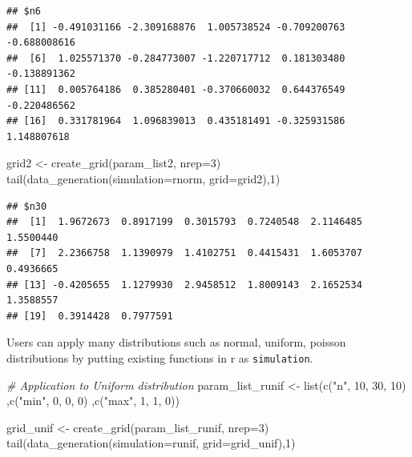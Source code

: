 \documentclass[11pt,a4paper]{article}
\newenvironment{Shaded}{\begin{snugshade}}{\end{snugshade}}
\newcommand{\AttributeTok}[1]{\textcolor[rgb]{0.77,0.63,0.00}{#1}}
\newcommand{\CommentTok}[1]{\textcolor[rgb]{0.56,0.35,0.01}{\textit{#1}}}
\newcommand{\DecValTok}[1]{\textcolor[rgb]{0.00,0.00,0.81}{#1}}
\newcommand{\FunctionTok}[1]{\textcolor[rgb]{0.00,0.00,0.00}{#1}}
\newcommand{\NormalTok}[1]{#1}
\newcommand{\OtherTok}[1]{\textcolor[rgb]{0.56,0.35,0.01}{#1}}
\newcommand{\StringTok}[1]{\textcolor[rgb]{0.31,0.60,0.02}{#1}}
\begin{document}
\begin{verbatim}
## $n6
##  [1] -0.491031166 -2.309168876  1.005738524 -0.709200763 -0.688008616
##  [6]  1.025571370 -0.284773007 -1.220717712  0.181303480 -0.138891362
## [11]  0.005764186  0.385280401 -0.370660032  0.644376549 -0.220486562
## [16]  0.331781964  1.096839013  0.435181491 -0.325931586  1.148807618
\end{verbatim}

\begin{Shaded}
\begin{Highlighting}[]
\NormalTok{grid2 }\OtherTok{\textless{}{-}} \FunctionTok{create\_grid}\NormalTok{(param\_list2, }\AttributeTok{nrep=}\DecValTok{3}\NormalTok{)}
\FunctionTok{tail}\NormalTok{(}\FunctionTok{data\_generation}\NormalTok{(}\AttributeTok{simulation=}\NormalTok{rnorm, }\AttributeTok{grid=}\NormalTok{grid2),}\DecValTok{1}\NormalTok{)}
\end{Highlighting}
\end{Shaded}

\begin{verbatim}
## $n30
##  [1]  1.9672673  0.8917199  0.3015793  0.7240548  2.1146485  1.5500440
##  [7]  2.2366758  1.1390979  1.4102751  0.4415431  1.6053707  0.4936665
## [13] -0.4205655  1.1279930  2.9458512  1.8009143  2.1652534  1.3588557
## [19]  0.3914428  0.7977591
\end{verbatim}

Users can apply many distributions such as normal, uniform, poisson
distributions by putting existing functions in r as \texttt{simulation}.

\begin{Shaded}
\begin{Highlighting}[]
\CommentTok{\# Application to Uniform distribution}
\NormalTok{param\_list\_runif }\OtherTok{\textless{}{-}} \FunctionTok{list}\NormalTok{(}\FunctionTok{c}\NormalTok{(}\StringTok{"n"}\NormalTok{, }\DecValTok{10}\NormalTok{, }\DecValTok{30}\NormalTok{, }\DecValTok{10}\NormalTok{)}
\NormalTok{                         ,}\FunctionTok{c}\NormalTok{(}\StringTok{"min"}\NormalTok{, }\DecValTok{0}\NormalTok{, }\DecValTok{0}\NormalTok{, }\DecValTok{0}\NormalTok{)}
\NormalTok{                         ,}\FunctionTok{c}\NormalTok{(}\StringTok{"max"}\NormalTok{, }\DecValTok{1}\NormalTok{, }\DecValTok{1}\NormalTok{, }\DecValTok{0}\NormalTok{))}


\NormalTok{grid\_unif }\OtherTok{\textless{}{-}} \FunctionTok{create\_grid}\NormalTok{(param\_list\_runif, }\AttributeTok{nrep=}\DecValTok{3}\NormalTok{)}
\FunctionTok{tail}\NormalTok{(}\FunctionTok{data\_generation}\NormalTok{(}\AttributeTok{simulation=}\NormalTok{runif, }\AttributeTok{grid=}\NormalTok{grid\_unif),}\DecValTok{1}\NormalTok{)}
\end{Highlighting}
\end{Shaded}
\end{document}
